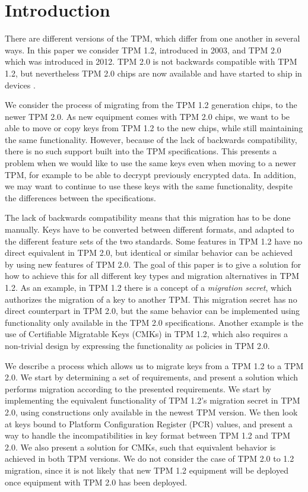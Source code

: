 {\section{Introduction}
There are different versions of the TPM, which differ from one another in several ways. In this paper we consider TPM 1.2, introduced in 2003, and TPM 2.0 which was introduced in 2012. TPM 2.0 is not backwards compatible with TPM 1.2, but nevertheless TPM 2.0 chips are now available \cite{infineon-tpm20-released} and have started to ship in devices \cite{infineon-tpm20-surfacepro}. %

We consider the process of migrating from the TPM 1.2 generation chips, to the newer TPM 2.0. As new equipment comes with TPM 2.0 chips, we want to be able to move or copy keys from TPM 1.2 to the new chips, while still maintaining the same functionality. However, because of the lack of backwards compatibility, there is no such support built into the TPM specifications. This presents a problem when we would like to use the same keys even when moving to a newer TPM, for example to be able to decrypt previously encrypted data. In addition, we may want to continue to use these keys with the same functionality, despite the differences between the specifications.

The lack of backwards compatibility means that this migration has to be done manually. Keys have to be converted between different formats, and adapted to the different feature sets of the two standards. Some features in TPM 1.2 have no direct equivalent in TPM 2.0, but identical or similar behavior can be achieved by using new features of TPM 2.0.
The goal of this paper is to give a solution for how to achieve this for all different key types and migration alternatives in TPM 1.2.
As an example, in TPM 1.2 there is a concept of a \emph{migration secret}, which authorizes the migration of a key to another TPM. This migration secret has no direct counterpart in TPM 2.0, but the same behavior can be implemented using functionality only available in the TPM 2.0 specifications.
Another example is the use of Certifiable Migratable Keys (CMKs) in TPM 1.2, which also requires a non-trivial design by expressing the functionality as policies in TPM 2.0.

We describe a process which allows us to migrate keys from a TPM 1.2 to a TPM 2.0. We start by determining a set of requirements, and present a solution which performs migration according to the presented requirements.
We start by implementing the equivalent functionality of TPM 1.2's migration secret in TPM 2.0, using constructions only available in the newest TPM version. We then look at keys bound to Platform Configuration Register (PCR) values, and present a way to handle the incompatibilities in key format between TPM 1.2 and TPM 2.0. We also present a solution for CMKs, such that equivalent behavior is achieved in both TPM versions.
We do not consider the case of TPM 2.0 to 1.2 migration, since it is not likely that new TPM 1.2 equipment will be deployed once equipment with TPM 2.0 has been deployed.

}
